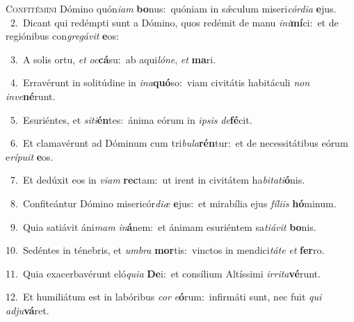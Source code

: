 \lettrine{\initial\textcolor{\initialcolor}{C}}{onfitémini} Dómino quón\-\textit{i}\-\textit{am} \textbf{bo}\-nus:~\star quóniam in sǽculum miseri\-\textit{cór}\-\textit{di}\textit{a} \textbf{e}\-jus.\\
{\numbfont\textcolor{\numbcolor}{~2.}}~Dicant qui redémpti sunt a Dómino, quos redémit de manu \textit{in}\-\textit{i}\textbf{mí}ci:~\star et de regiónibus con\-\textit{gre}\-\textit{gá}\textit{vit} \textbf{e}\-os:\par
{\numbfont\textcolor{\numbcolor}{~3.}}~A solis ortu, \textit{et} \textit{oc}\-\textbf{cá}su:~\star ab aqui\-\textit{ló}\-\textit{ne}, \textit{et} \textbf{ma}\-ri.\par
{\numbfont\textcolor{\numbcolor}{~4.}}~Erravérunt in solitúdine in \textit{in}\-\textit{a}\textbf{quó}so:~\star viam civitátis habitáculi \textit{non} \textit{in}\-\textit{ve}\textbf{né}runt.\par
{\numbfont\textcolor{\numbcolor}{~5.}}~Esuriéntes, et \textit{si}\-\textit{ti}\textbf{én}tes:~\star ánima eórum in \textit{ip}\-\textit{sis} \textit{de}\-\textbf{fé}cit.\par
{\numbfont\textcolor{\numbcolor}{~6.}}~Et clamavérunt ad Dóminum cum tri\-\textit{bu}\-\textit{la}\textbf{rén}tur:~\star et de necessitátibus eórum e\-\textit{rí}\-\textit{pu}\textit{it} \textbf{e}\-os.\par
{\numbfont\textcolor{\numbcolor}{~7.}}~Et dedúxit eos in \textit{vi}\-\textit{am} \textbf{rec}\-tam:~\star ut irent in civitátem ha\-\textit{bi}\-\textit{ta}\textit{ti}\textbf{ó}nis.\par
{\numbfont\textcolor{\numbcolor}{~8.}}~Confiteántur Dómino misericór\-\textit{di}\-\textit{æ} \textbf{e}\-jus:~\star et mirabília ejus \textit{fí}\-\textit{li}\textit{is} \textbf{hó}\-minum.\par
{\numbfont\textcolor{\numbcolor}{~9.}}~Quia satiávit áni\textit{mam} \textit{in}\-\textbf{á}nem:~\star et ánimam esuriéntem sa\-\textit{ti}\-\textit{á}\textit{vit} \textbf{bo}\-nis.\par
{\numbfont\textcolor{\numbcolor}{10.}}~Sedéntes in ténebris, et \textit{um}\-\textit{bra} \textbf{mor}\-tis:~\star vinctos in mendici\-\textit{tá}\-\textit{te} \textit{et} \textbf{fer}\-ro.\par
{\numbfont\textcolor{\numbcolor}{11.}}~Quia exacerbavérunt eló\-\textit{qui}\-\textit{a} \textbf{De}\-i:~\star et consílium Altíssimi \textit{ir}\-\textit{ri}\textit{ta}\textbf{vé}runt.\par
{\numbfont\textcolor{\numbcolor}{12.}}~Et humiliátum est in labóribus \textit{cor} \textit{e}\-\textbf{ó}rum:~\star infirmáti sunt, nec fuit \textit{qui} \textit{ad}\-\textit{ju}\textbf{vá}ret.\par
